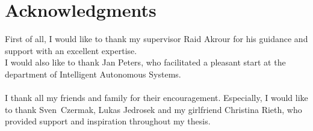 \chapter*{Acknowledgments}

First of all, I would like to thank my supervisor Raid Akrour for his guidance and support with an excellent expertise.\\
I would also like to thank Jan Peters, who facilitated a pleasant start at the department of Intelligent Autonomous \mbox{Systems}.\\
\\
I thank all my friends and family for their encouragement. Especially, I would like to thank \mbox{Sven Czermak}, Lukas Jedrosek and my girlfriend Christina Rieth, who provided support and inspiration throughout my thesis.
